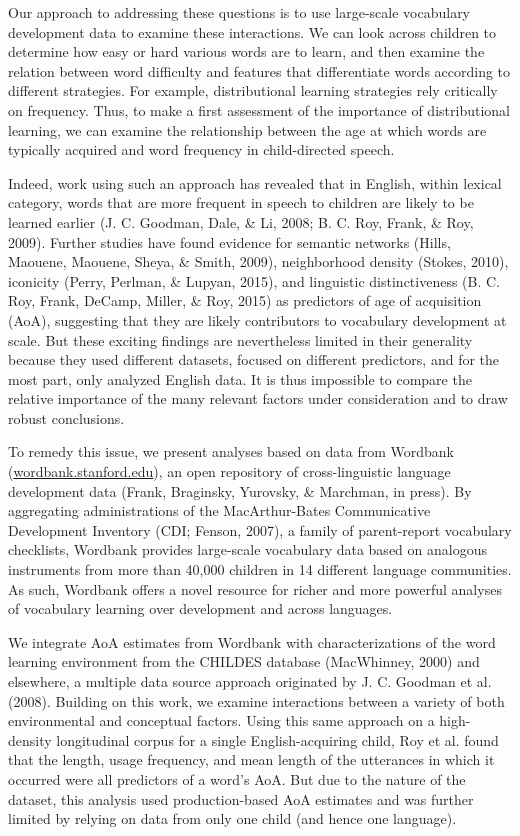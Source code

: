 \documentclass[10pt, letterpaper]{article}
\begin{document}
Our approach to addressing these questions is to use large-scale
vocabulary development data to examine these interactions. We can look
across children to determine how easy or hard various words are to
learn, and then examine the relation between word difficulty and
features that differentiate words according to different strategies. For
example, distributional learning strategies rely critically on
frequency. Thus, to make a first assessment of the importance of
distributional learning, we can examine the relationship between the age
at which words are typically acquired and word frequency in
child-directed speech.

Indeed, work using such an approach has revealed that in English, within
lexical category, words that are more frequent in speech to children are
likely to be learned earlier (J. C. Goodman, Dale, \& Li, 2008; B. C.
Roy, Frank, \& Roy, 2009). Further studies have found evidence for
semantic networks (Hills, Maouene, Maouene, Sheya, \& Smith, 2009),
neighborhood density (Stokes, 2010), iconicity (Perry, Perlman, \&
Lupyan, 2015), and linguistic distinctiveness (B. C. Roy, Frank, DeCamp,
Miller, \& Roy, 2015) as predictors of age of acquisition (AoA),
suggesting that they are likely contributors to vocabulary development
at scale. But these exciting findings are nevertheless limited in their
generality because they used different datasets, focused on different
predictors, and for the most part, only analyzed English data. It is
thus impossible to compare the relative importance of the many relevant
factors under consideration and to draw robust conclusions.

To remedy this issue, we present analyses based on data from Wordbank
(\href{http://wordbank.stanford.edu}{wordbank.stanford.edu}), an open
repository of cross-linguistic language development data (Frank,
Braginsky, Yurovsky, \& Marchman, in press). By aggregating
administrations of the MacArthur-Bates Communicative Development
Inventory (CDI; Fenson, 2007), a family of parent-report vocabulary
checklists, Wordbank provides large-scale vocabulary data based on
analogous instruments from more than 40,000 children in 14 different
language communities. As such, Wordbank offers a novel resource for
richer and more powerful analyses of vocabulary learning over
development and across languages.

We integrate AoA estimates from Wordbank with characterizations of the
word learning environment from the CHILDES database (MacWhinney, 2000)
and elsewhere, a multiple data source approach originated by J. C.
Goodman et al. (2008). Building on this work, we examine interactions
between a variety of both environmental and conceptual factors. Using
this same approach on a high-density longitudinal corpus for a single
English-acquiring child, Roy et al. found that the length, usage
frequency, and mean length of the utterances in which it occurred were
all predictors of a word's AoA. But due to the nature of the dataset,
this analysis used production-based AoA estimates and was further
limited by relying on data from only one child (and hence one language).
\end{document}
